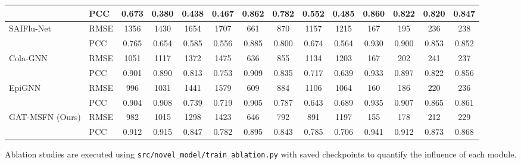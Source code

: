 \documentclass[lettersize, journal]{IEEEtran}
\begin{document}
\begin{table}[ht]
{\begin{tabular}{llcccccccccccc}
         & PCC  & 0.673 & 0.380 & 0.438 & 0.467 & 0.862 & 0.782 & 0.552 & 0.485 & 0.860 & 0.822 & 0.820 & 0.847 \\
        \midrule
        \multirow{2}{*}{SAIFlu-Net} 
         & RMSE & 1356 & 1430 & 1654 & 1707 & 661 & 870 & 1157 & 1215 & 167 & 195 & 236 & 238 \\
         & PCC  & 0.765 & 0.654 & 0.585 & 0.556 & 0.885 & 0.800 & 0.674 & 0.564 & 0.930 & 0.900 & 0.853 & 0.852 \\
        \midrule
        \multirow{2}{*}{Cola-GNN} 
         & RMSE & 1051 & 1117 & 1372 & 1475 & 636 & 855 & 1134 & 1203 & 167 & 202 & 241 & 237 \\
         & PCC  & 0.901 & 0.890 & 0.813 & 0.753 & 0.909 & 0.835 & 0.717 & 0.639 & 0.933 & 0.897 & 0.822 & 0.856 \\
        \midrule
        \multirow{2}{*}{EpiGNN} 
         & RMSE & 996 & 1031 & 1441 & 1579 & 609 & 884 & 1106 & 1064 & 160 & 186 & 220 & 236 \\
         & PCC  & 0.904 & 0.908 & 0.739 & 0.719 & 0.905 & 0.787 & 0.643 & 0.689 & 0.935 & 0.907 & 0.865 & 0.861 \\
        \midrule
        \multirow{2}{*}{GAT-MSFN (Ours)} 
         & RMSE & 982 & 1015 & 1298 & 1423 & 646 & 792 & 891 & 1197 & 155 & 178 & 212 & 229 \\
         & PCC  & 0.912 & 0.915 & 0.847 & 0.782 & 0.895 & 0.843 & 0.785 & 0.706 & 0.941 & 0.912 & 0.873 & 0.868 \\
        \bottomrule
    \end{tabular}%
    }
\end{table}

Ablation studies are executed using \texttt{src/novel\_model/train\_ablation.py} with saved checkpoints to quantify the influence of each module.
\end{document}
